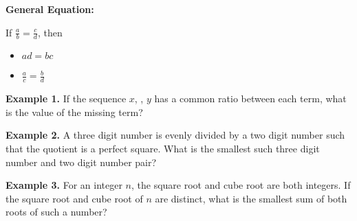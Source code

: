 \bigskip
\textbf{General Equation:}

\bigskip
If $\frac{a}{b}=\frac{c}{d}$, then

\bigskip
\begin{itemize}[label=$\bullet$]
\item $ad=bc$

\bigskip
\item $\frac{a}{c}=\frac{b}{d}$
\end{itemize}

\vfill
\textbf{Example 1.} If the sequence $x$, \shortline, $y$ has a common ratio between each term, what is the value of the missing term?

\vfill
\textbf{Example 2.} A three digit number is evenly divided by a two digit number such that the quotient is a perfect square. What is the smallest such three digit number and two digit number pair?

\vfill
\textbf{Example 3.} For an integer $n$, the square root and cube root are both integers. If the square root and cube root of $n$ are distinct, what is the smallest sum of both roots of such a number?

